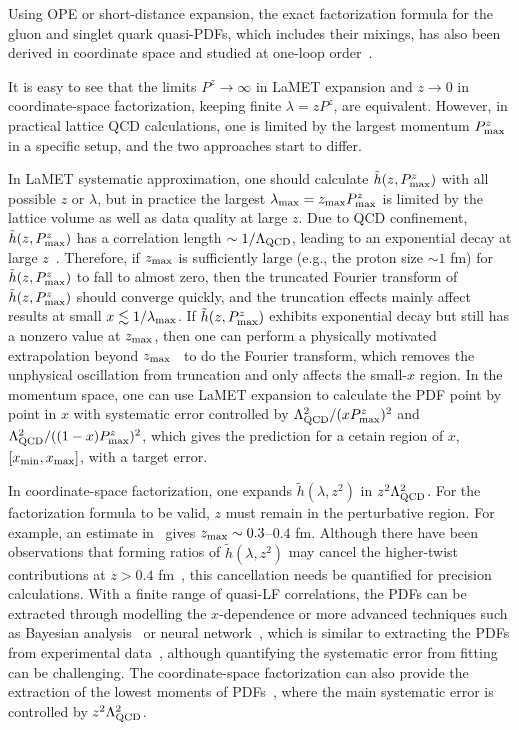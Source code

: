 Using OPE or short-distance expansion, the exact factorization formula for the gluon and singlet quark quasi-PDFs, which includes their mixings, has also been derived in coordinate space and studied at one-loop order~\cite{Wang:2019tgg,Balitsky:2019krf}.

It is easy to see that the limits $P^z\to\infty$ in LaMET expansion and $z\to 0$
in coordinate-space factorization, keeping finite $\lambda=zP^z$, are equivalent.  However, in practical
lattice QCD calculations, one is limited by the largest
momentum $P^z_{\rm max}$ in a specific setup, and the two approaches start to differ.

In LaMET systematic approximation, one should calculate $\tilde h (z, P^z_{\rm max})$ with
all possible $z$ or $\lambda$, but in practice the largest $\lambda_{\rm max} = z_{\rm max}P^z_{\rm max}$
is limited by the lattice volume as well as data quality at large $z$. Due to QCD confinement, $\tilde h (z, P^z_{\rm max})$ has a correlation length $\sim 1/\Lambda_{\rm QCD}$, leading to an exponential decay
at large $z$~\cite{Ji:2020brr}. Therefore, if $z_{\rm max}$ is sufficiently large (e.g., the proton size $\sim1$ fm) for $\tilde h (z, P^z_{\rm max})$ to fall to almost zero, then the truncated Fourier transform of $\tilde h (z, P^z_{\rm max})$
should converge quickly, and the truncation effects mainly affect results at small $x \lesssim 1/\lambda_{\rm max}$. If $\tilde h (z, P^z_{\rm max})$ exhibits exponential decay but still has a nonzero value at $z_{\rm max}$, then one can perform a physically motivated extrapolation beyond $z_{\rm max}$~\cite{Ji:2020brr} to do the Fourier transform, which removes the unphysical oscillation from truncation and only affects the small-$x$ region. In the momentum space, one can use LaMET expansion to calculate the PDF point by point in $x$ with systematic error controlled by $\Lambda_{\rm QCD}^2/(xP^z_{\rm max})^2$ and $\Lambda_{\rm QCD}^2/((1-x)P^z_{\rm max})^2$, which gives the prediction for a cetain region of $x$, $[x_{\rm min}, x_{\rm max}]$, with a target error.

In coordinate-space factorization, one expands $\tilde h(\lambda, z^2)$ in $z^2\Lambda^2_{\rm QCD}$. For the factorization formula to be valid,  $z$ must remain in the perturbative region. For example, an estimate in~\cite{Ji:2020brr} gives $z_{\rm max}\sim 0.3$--$0.4$ fm. Although there have been observations that forming ratios of $\tilde h (\lambda, z^2)$ may cancel the higher-twist contributions at $z>0.4$ fm~\cite{Orginos:2017kos}, this cancellation needs be quantified
for precision calculations. With a finite range of quasi-LF correlations, the PDFs can be extracted through modelling
the $x$-dependence or more advanced techniques such as Bayesian analysis~\cite{Bringewatt:2020ixn} or neural network~\cite{Karpie:2019eiq,Cichy:2019ebf,DelDebbio:2020rgv}, which is similar to extracting the PDFs from experimental data~\cite{Ma:2017pxb}, although quantifying the
systematic error from fitting can be challenging. The coordinate-space factorization can also provide the extraction of the lowest moments of PDFs~\cite{Karpie:2018zaz,Shugert:2020tgq,Joo:2020spy,Gao:2020ito}, where the main systematic error is controlled by $z^2\Lambda_{\rm QCD}^2$.

